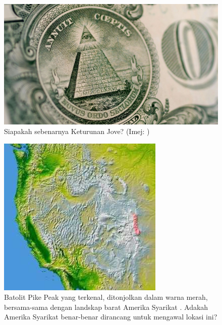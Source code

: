\documentclass[10pt,twocolumn,letterpaper]{article}
\begin{document}
\begin{figure}[t]
\begin{center}
   \includegraphics[width=1\linewidth]{illuminati.jpg}
\end{center}
   \caption{Siapakah sebenarnya Keturunan Jove? (Imej: \cite{35})}
\label{fig:10}
\label{fig:onecol}
\end{figure}

\begin{figure}[t]
\begin{center}
   \includegraphics[width=1\linewidth]{pike.jpg}
\end{center}
   \caption{Batolit Pike Peak yang terkenal, ditonjolkan dalam warna merah, bersama-sama dengan landskap barat Amerika Syarikat \cite{36}. Adakah Amerika Syarikat benar-benar dirancang untuk mengawal lokasi ini?}
\label{fig:11}
\label{fig:onecol}
\end{figure}
\end{document}
